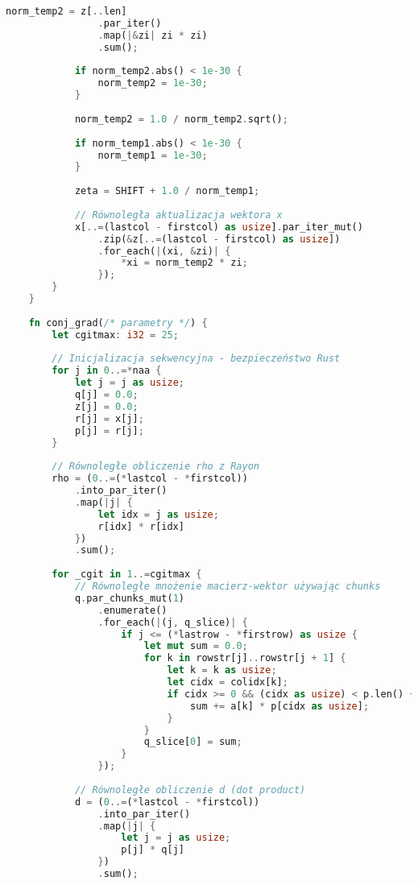 \begin{lstlisting}[language=Rust, caption={Implementacja benchmarku CG w języku Rust}, label={lst:cg_rust}]
            norm_temp2 = z[..len]
                .par_iter()
                .map(|&zi| zi * zi)
                .sum();
    
            if norm_temp2.abs() < 1e-30 {
                norm_temp2 = 1e-30;
            }
    
            norm_temp2 = 1.0 / norm_temp2.sqrt();
            
            if norm_temp1.abs() < 1e-30 {
                norm_temp1 = 1e-30;
            }
            
            zeta = SHIFT + 1.0 / norm_temp1;
            
            // Równoległa aktualizacja wektora x
            x[..=(lastcol - firstcol) as usize].par_iter_mut()
                .zip(&z[..=(lastcol - firstcol) as usize])
                .for_each(|(xi, &zi)| {
                    *xi = norm_temp2 * zi;
                });
        }
    }
    
    fn conj_grad(/* parametry */) {
        let cgitmax: i32 = 25;
        
        // Inicjalizacja sekwencyjna - bezpieczeństwo Rust
        for j in 0..=*naa {
            let j = j as usize;
            q[j] = 0.0;
            z[j] = 0.0;
            r[j] = x[j];
            p[j] = r[j];
        }
    
        // Równoległe obliczenie rho z Rayon
        rho = (0..=(*lastcol - *firstcol))
            .into_par_iter()
            .map(|j| {
                let idx = j as usize;
                r[idx] * r[idx]
            })
            .sum();
    
        for _cgit in 1..=cgitmax {
            // Równoległe mnożenie macierz-wektor używając chunks
            q.par_chunks_mut(1)
                .enumerate()
                .for_each(|(j, q_slice)| {
                    if j <= (*lastrow - *firstrow) as usize {
                        let mut sum = 0.0;
                        for k in rowstr[j]..rowstr[j + 1] {
                            let k = k as usize;
                            let cidx = colidx[k];
                            if cidx >= 0 && (cidx as usize) < p.len() {
                                sum += a[k] * p[cidx as usize];
                            }
                        }
                        q_slice[0] = sum;
                    }
                });
    
            // Równoległe obliczenie d (dot product)
            d = (0..=(*lastcol - *firstcol))
                .into_par_iter()
                .map(|j| {
                    let j = j as usize;
                    p[j] * q[j]
                })
                .sum();
    

\end{lstlisting}
